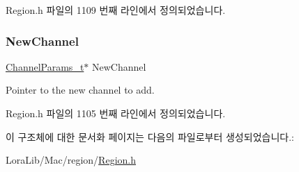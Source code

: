 Region.\+h 파일의 1109 번째 라인에서 정의되었습니다.

\mbox{\label{structs_channel_add_params_afc31493a105479490228fd896b20b45c}} 
\subsubsection{\texorpdfstring{New\+Channel}{NewChannel}}
{\footnotesize\ttfamily \mbox{\hyperlink{group___l_o_r_a_m_a_c_ga1360ca6f82c6d125ea43a9dad9b56184}{Channel\+Params\+\_\+t}}$\ast$ New\+Channel}

Pointer to the new channel to add. 

Region.\+h 파일의 1105 번째 라인에서 정의되었습니다.



이 구조체에 대한 문서화 페이지는 다음의 파일로부터 생성되었습니다.\+:\begin{DoxyCompactItemize}
\item 
Lora\+Lib/\+Mac/region/\mbox{\hyperlink{_region_8h}{Region.\+h}}\end{DoxyCompactItemize}
